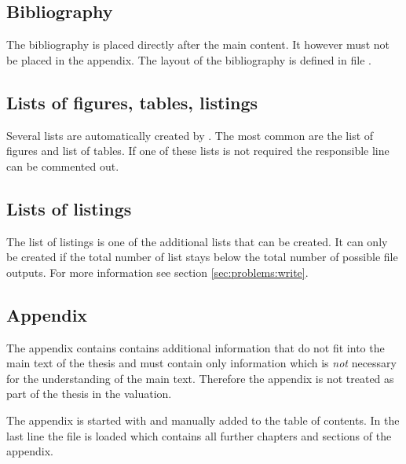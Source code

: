 \subsection{Bibliography}
The bibliography is placed directly after the main content. It however must 
not be placed in the appendix. The layout of the bibliography is defined in 
file .
%

\subsection{Lists of figures, tables, listings}
Several lists are automatically created by \latex. The most common are the list of figures and list of tables. If one of these lists is not required the responsible line can be commented out. 
%

\subsection{Lists of listings}
The list of listings is one of the additional lists that can be created. 
It can only be created if the total number of list stays below the total number of possible file outputs. For more information see section \ref{sec:problems:write}.


\subsection{Appendix}
The appendix contains contains additional information that do not fit into the main text of the thesis and must contain only information which is \emph{not} necessary for the understanding of the main text. Therefore the appendix is not treated as part of the thesis in the valuation.

The appendix is started with  and manually added to the table of contents. In the last line the file  is loaded which contains all further chapters and sections of the appendix.
%

